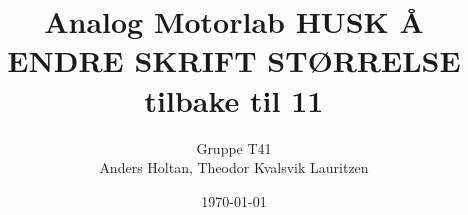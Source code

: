 \documentclass[12pt, a4paper, twocolumn, norsk]{article} %
\begin{document}
\title{Analog Motorlab HUSK Å ENDRE SKRIFT STØRRELSE tilbake til 11}
\author{Gruppe T41\\
        Anders Holtan, Theodor Kvalsvik Lauritzen}
\date{\today}


\maketitle









{}
\printbibliography{}
\label{sec:bibliography}
\end{document}
